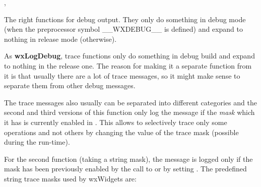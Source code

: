 
,


\label{wxlogdebug}



The right functions for debug output. They only do something in debug
mode (when the preprocessor symbol \_\_WXDEBUG\_\_ is defined) and expand to
nothing in release mode (otherwise).


\label{wxlogtrace}







As {\bf wxLogDebug}, trace functions only do something in debug build and
expand to nothing in the release one. The reason for making
it a separate function from it is that usually there are a lot of trace
messages, so it might make sense to separate them from other debug messages.

The trace messages also usually can be separated into different categories and
the second and third versions of this function only log the message if the
{\it mask} which it has is currently enabled in . This
allows to selectively trace only some operations and not others by changing
the value of the trace mask (possible during the run-time).

For the second function (taking a string mask), the message is logged only if
the mask has been previously enabled by the call to
 or by setting
.
The predefined string trace masks
used by wxWidgets are:

